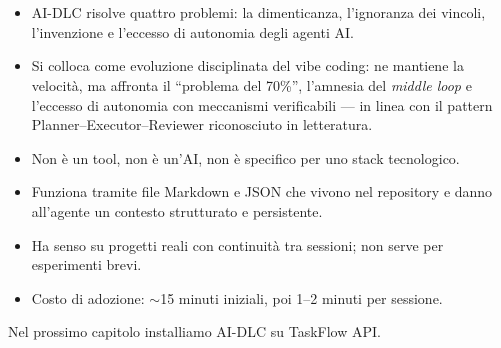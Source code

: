 \section*{\LabelSummary}

\begin{itemize}
  \item AI-DLC risolve quattro problemi: la dimenticanza, l'ignoranza dei vincoli, l'invenzione e l'eccesso di autonomia degli agenti AI.
  \item Si colloca come evoluzione disciplinata del vibe coding: ne mantiene la velocità, ma affronta il ``problema del 70\%'', l'amnesia del \textit{middle loop} e l'eccesso di autonomia con meccanismi verificabili --- in linea con il pattern Planner--Executor--Reviewer riconosciuto in letteratura.
  \item Non è un tool, non è un'AI, non è specifico per uno stack tecnologico.
  \item Funziona tramite file Markdown e JSON che vivono nel repository e danno all'agente un contesto strutturato e persistente.
  \item Ha senso su progetti reali con continuità tra sessioni; non serve per esperimenti brevi.
  \item Costo di adozione: $\sim$15 minuti iniziali, poi 1--2 minuti per sessione.
\end{itemize}

Nel prossimo capitolo installiamo AI-DLC su TaskFlow API.
